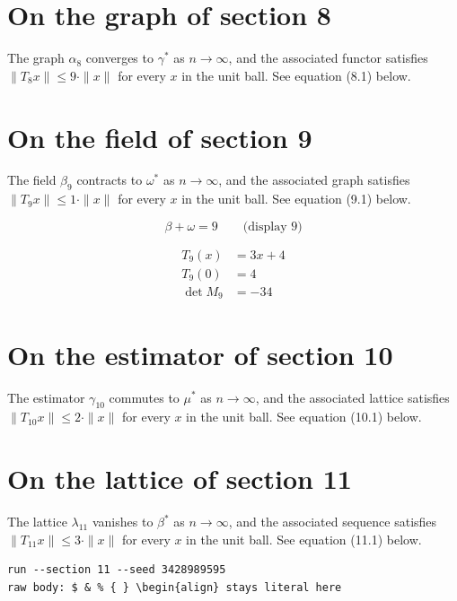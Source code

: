 \documentclass{article}
\begin{document}
\section{On the graph of section 8}
The graph $\alpha_{8}$ converges to $\gamma^{*}$ as $n \to \infty$,
and the associated functor satisfies $\|T_{8} x\| \leq 9 \cdot \|x\|$
for every $x$ in the unit ball. See equation (8.1) below.

\section{On the field of section 9}
The field $\beta_{9}$ contracts to $\omega^{*}$ as $n \to \infty$,
and the associated graph satisfies $\|T_{9} x\| \leq 1 \cdot \|x\|$
for every $x$ in the unit ball. See equation (9.1) below.

$$
\beta + \omega = 9 \qquad \text{(display 9)}
$$

\begin{align}
T_{9}(x) &= 3 x + 4 \\
T_{9}(0) &= 4 \\
\det M_{9} &= -34
\end{align}

\section{On the estimator of section 10}
The estimator $\gamma_{10}$ commutes to $\mu^{*}$ as $n \to \infty$,
and the associated lattice satisfies $\|T_{10} x\| \leq 2 \cdot \|x\|$
for every $x$ in the unit ball. See equation (10.1) below.

\section{On the lattice of section 11}
The lattice $\lambda_{11}$ vanishes to $\beta^{*}$ as $n \to \infty$,
and the associated sequence satisfies $\|T_{11} x\| \leq 3 \cdot \|x\|$
for every $x$ in the unit ball. See equation (11.1) below.

\begin{verbatim}
run --section 11 --seed 3428989595
raw body: $ & % { } \begin{align} stays literal here
\end{verbatim}
\end{document}
